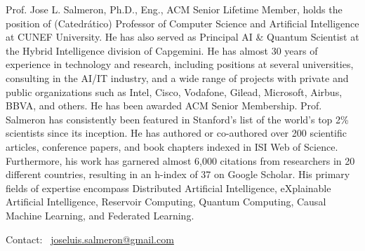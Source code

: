 {\small 
Prof. Jose L. Salmeron, Ph.D., Eng., ACM Senior Lifetime Member, holds the position of (Catedrático) Professor of Computer Science and Artificial Intelligence at CUNEF University. He has also served as Principal AI \& Quantum Scientist at the Hybrid Intelligence division of Capgemini. He has almost 30 years of experience in technology and research, including positions at several universities, consulting in the AI/IT industry, and a wide range of projects with private and public organizations such as Intel, Cisco, Vodafone, Gilead, Microsoft, Airbus, BBVA, and others. He has been awarded ACM Senior Membership. Prof. Salmeron has consistently been featured in Stanford's list of the world’s top 2\% scientists since its inception. He has authored or co-authored over 200 scientific articles, conference papers, and book chapters indexed in ISI Web of Science. Furthermore, his work has garnered almost 6,000 citations from researchers in 20 different countries, resulting in an h-index of 37 on Google Scholar. His primary fields of expertise encompass Distributed Artificial Intelligence, eXplainable Artificial Intelligence, Reservoir Computing, Quantum Computing, Causal Machine Learning, and Federated Learning.}

Contact: \faEnvelope\ \href{mailto:joseluis.salmeron@gmail.com}{joseluis.salmeron@gmail.com}